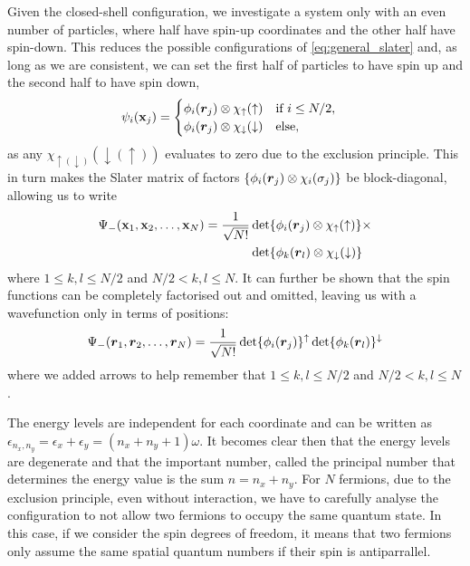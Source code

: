 Given the closed-shell configuration, we investigate a system only with an even number of particles, where half have spin-up coordinates and the other half have spin-down. This reduces the possible configurations of \eqref{eq:general_slater} and, as long as we are consistent, we can set the first half of particles to have spin up and the second half to have spin down,
\begin{align}
    \psi_i(\mathbf{x}_j) = \begin{cases}
        \phi_i(\boldsymbol{r}_j)\otimes\chi_{\uparrow}(\uparrow) \quad \text{if } i \le N/2, \\
        \phi_i(\boldsymbol{r}_j)\otimes\chi_{\downarrow}(\downarrow)\quad \text{else},
    \end{cases}
\end{align}
as any $\chi_{\uparrow (\downarrow)}(\downarrow (\uparrow))$ evaluates to zero due to the exclusion principle. This in turn makes the Slater matrix of factors $\{\phi_i(\boldsymbol{r}_j)\otimes\chi_{i}(\sigma_j)\}$ be block-diagonal, allowing us to write
\begin{equation*}
    \begin{split}
\Psi_-(\mathbf{x}_1, \mathbf{x}_2, \ldots, \mathbf{x}_N) 
= \frac{1}{\sqrt{N!}}  &\det\{\phi_i(\boldsymbol{r}_j)\otimes\chi_{\uparrow}(\uparrow)\}\times \\ &\det\{\phi_k(\boldsymbol{r}_l)\otimes\chi_{\downarrow}(\downarrow)\}
\end{split}
\end{equation*}
where ${1 \leq k,l \leq  N/2} $ and ${N/2 < k,l \leq  N}$. It can further be shown that the spin functions can be completely factorised out and omitted, leaving us with a wavefunction only in terms of positions:
\begin{equation*}
    \begin{split}
\Psi_-(\boldsymbol{r}_1, \boldsymbol{r}_2, \ldots, \boldsymbol{r}_N) 
= \frac{1}{\sqrt{N!}}  \det\{\phi_i(\boldsymbol{r}_j)\}^{\uparrow}\det\{\phi_k(\boldsymbol{r}_l)\}^{\downarrow}
\end{split}
\end{equation*}
 where we added arrows to help remember that ${1 \leq k,l \leq  N/2} $ and ${N/2 < k,l \leq  N}$.

The energy levels are independent for each coordinate and can be written as $\epsilon_{n_x,n_y}= \epsilon_x + \epsilon_y = (n_x + n_y + 1)\omega$. It becomes clear then that the energy levels are degenerate and that the important number, called the principal number that determines the energy value is the sum $n = n_x + n_y$. For $N$ fermions, due to the exclusion principle, even without interaction, we have to carefully analyse the configuration to not allow two fermions to occupy the same quantum state. In this case, if we consider the spin degrees of freedom, it means that two fermions only assume the same spatial quantum numbers if their spin is antiparrallel. 

